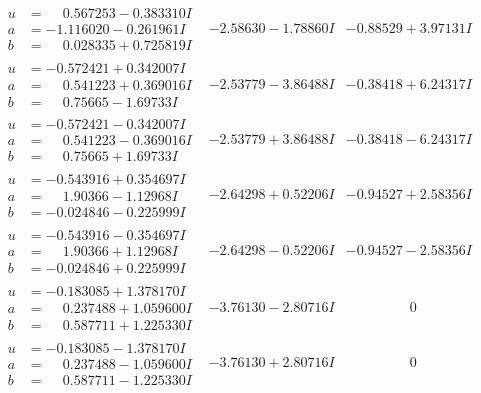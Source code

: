 \documentclass[1p]{elsarticle_modified}
\theoremstyle{definition}
\begin{document}
$$\begin{array}{c|c|c}
\begin{aligned}
u &= \phantom{-}0.567253 - 0.383310 I \\
a &= -1.116020 - 0.261961 I \\
b &= \phantom{-}0.028335 + 0.725819 I\end{aligned}
 & -2.58630 - 1.78860 I & -0.88529 + 3.97131 I \\ \hline\begin{aligned}
u &= -0.572421 + 0.342007 I \\
a &= \phantom{-}0.541223 + 0.369016 I \\
b &= \phantom{-}0.75665 - 1.69733 I\end{aligned}
 & -2.53779 - 3.86488 I & -0.38418 + 6.24317 I \\ \hline\begin{aligned}
u &= -0.572421 - 0.342007 I \\
a &= \phantom{-}0.541223 - 0.369016 I \\
b &= \phantom{-}0.75665 + 1.69733 I\end{aligned}
 & -2.53779 + 3.86488 I & -0.38418 - 6.24317 I \\ \hline\begin{aligned}
u &= -0.543916 + 0.354697 I \\
a &= \phantom{-}1.90366 - 1.12968 I \\
b &= -0.024846 - 0.225999 I\end{aligned}
 & -2.64298 + 0.52206 I & -0.94527 + 2.58356 I \\ \hline\begin{aligned}
u &= -0.543916 - 0.354697 I \\
a &= \phantom{-}1.90366 + 1.12968 I \\
b &= -0.024846 + 0.225999 I\end{aligned}
 & -2.64298 - 0.52206 I & -0.94527 - 2.58356 I \\ \hline\begin{aligned}
u &= -0.183085 + 1.378170 I \\
a &= \phantom{-}0.237488 + 1.059600 I \\
b &= \phantom{-}0.587711 + 1.225330 I\end{aligned}
 & -3.76130 - 2.80716 I & \phantom{-0.000000 } 0 \\ \hline\begin{aligned}
u &= -0.183085 - 1.378170 I \\
a &= \phantom{-}0.237488 - 1.059600 I \\
b &= \phantom{-}0.587711 - 1.225330 I\end{aligned}
 & -3.76130 + 2.80716 I & \phantom{-0.000000 } 0\\

\end{array}$$
\end{document}
